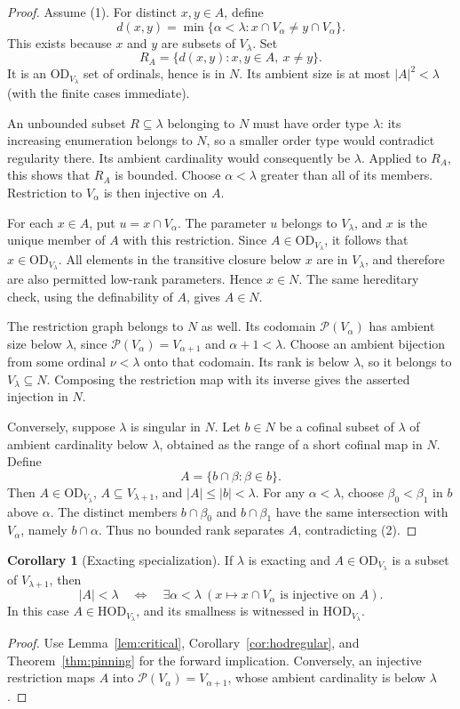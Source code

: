 \documentclass[11pt,letterpaper]{article}
\theoremstyle{definition}
\newtheorem{corollary}[definition]{Corollary}
\numberwithin{equation}{section}
\newcommand{\HOD}{\mathrm{HOD}}
\newcommand{\OD}{\mathrm{OD}}
\newcommand{\Pow}{\mathcal P}
\newcommand{\NN}{\HOD_{V_\lambda}}
\begin{document}
\begin{proof}
Assume (1). For distinct $x,y\in A$, define
\[
 d(x,y)=\min\{\alpha<\lambda:x\cap V_\alpha\ne y\cap V_\alpha\}.
\]
This exists because $x$ and $y$ are subsets of $V_\lambda$. Set
\[
 R_A=\{d(x,y):x,y\in A,\ x\ne y\}.
\]
It is an $\OD_{V_\lambda}$ set of ordinals, hence is in $N$. Its ambient size is at most $|A|^2<\lambda$ (with the finite cases immediate).

An unbounded subset $R\subseteq\lambda$ belonging to $N$ must have order type $\lambda$: its increasing enumeration belongs to $N$, so a smaller order type would contradict regularity there. Its ambient cardinality would consequently be $\lambda$. Applied to $R_A$, this shows that $R_A$ is bounded. Choose $\alpha<\lambda$ greater than all of its members. Restriction to $V_\alpha$ is then injective on $A$.

For each $x\in A$, put $u=x\cap V_\alpha$. The parameter $u$ belongs to $V_\lambda$, and $x$ is the unique member of $A$ with this restriction. Since $A\in\OD_{V_\lambda}$, it follows that $x\in\OD_{V_\lambda}$. All elements in the transitive closure below $x$ are in $V_\lambda$, and therefore are also permitted low-rank parameters. Hence $x\in N$. The same hereditary check, using the definability of $A$, gives $A\in N$.

The restriction graph belongs to $N$ as well. Its codomain $\Pow(V_\alpha)$ has ambient size below $\lambda$, since $\Pow(V_\alpha)=V_{\alpha+1}$ and $\alpha+1<\lambda$. Choose an ambient bijection from some ordinal $\nu<\lambda$ onto that codomain. Its rank is below $\lambda$, so it belongs to $V_\lambda\subseteq N$. Composing the restriction map with its inverse gives the asserted injection in $N$.

Conversely, suppose $\lambda$ is singular in $N$. Let $b\in N$ be a cofinal subset of $\lambda$ of ambient cardinality below $\lambda$, obtained as the range of a short cofinal map in $N$. Define
\[
 A=\{b\cap\beta:\beta\in b\}.
\]
Then $A\in\OD_{V_\lambda}$, $A\subseteq V_{\lambda+1}$, and $|A|\le|b|<\lambda$. For any $\alpha<\lambda$, choose $\beta_0<\beta_1$ in $b$ above $\alpha$. The distinct members $b\cap\beta_0$ and $b\cap\beta_1$ have the same intersection with $V_\alpha$, namely $b\cap\alpha$. Thus no bounded rank separates $A$, contradicting (2).
\end{proof}

\begin{corollary}[Exacting specialization]\label{cor:pinningex}
If $\lambda$ is exacting and $A\in\OD_{V_\lambda}$ is a subset of $V_{\lambda+1}$, then
\[
 |A|<\lambda
 \quad\Longleftrightarrow\quad
 \exists\alpha<\lambda\ 
 (x\mapsto x\cap V_\alpha\text{ is injective on }A).
\]
In this case $A\in\NN$, and its smallness is witnessed in $\NN$.
\end{corollary}
\begin{proof}
Use Lemma~\ref{lem:critical}, Corollary~\ref{cor:hodregular}, and Theorem~\ref{thm:pinning} for the forward implication. Conversely, an injective restriction maps $A$ into $\Pow(V_\alpha)=V_{\alpha+1}$, whose ambient cardinality is below $\lambda$.
\end{proof}
\end{document}
